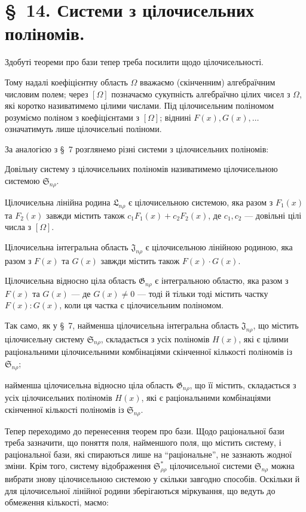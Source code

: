 \documentclass[11pt]{article}
\providecommand{\Ssys}{\mathfrak{S}}
\providecommand{\Jdom}{\mathfrak{J}}
\providecommand{\Gdom}{\mathfrak{G}}
\providecommand{\Lsys}{\mathfrak{L}}
\begin{document}
\section*{\S\ 14. Системи з цілочисельних поліномів.}

Здобуті теореми про бази тепер треба посилити щодо цілочисельності.

Тому надалі коефіцієнтну область $\Omega$ вважаємо (скінченним) алгебраїчним числовим полем; через $[\Omega]$ позначаємо сукупність алгебраїчно цілих чисел з $\Omega$, які коротко називатимемо цілими числами. Під цілочисельним поліномом розуміємо поліном з коефіцієнтами з $[\Omega]$; віднині $F(x),G(x),\ldots$ означатимуть лише цілочисельні поліноми.

За аналогією з \S\ 7 розглянемо різні системи з цілочисельних поліномів:

Довільну систему з цілочисельних поліномів називатимемо цілочисельною системою $\Ssys_{n\rho}$.

Цілочисельна лінійна родина $\Lsys_{n\rho}$ є цілочисельною системою, яка разом з $F_1(x)$ та $F_2(x)$ завжди містить також $c_1F_1(x)+c_2F_2(x)$, де $c_1,c_2$ --- довільні цілі числа з $[\Omega]$.

Цілочисельна інтегральна область $\Jdom_{n\rho}$ є цілочисельною лінійною родиною, яка разом з $F(x)$ та $G(x)$ завжди містить також $F(x)\cdot G(x)$.

Цілочисельна відносно ціла область $\Gdom_{n\rho}$ є інтегральною областю, яка разом з $F(x)$ та $G(x)$ --- де $G(x)\ne0$ --- тоді й тільки тоді містить частку $F(x):G(x)$, коли ця частка є цілочисельним поліномом.

Так само, як у \S\ 7, найменша цілочисельна інтегральна область $\Jdom_{n\rho}$, що містить цілочисельну систему $\Ssys_{n\rho}$, складається з усіх поліномів $H(x)$, які є цілими раціональними цілочисельними комбінаціями скінченної кількості поліномів із $\Ssys_{n\rho}$;

найменша цілочисельна відносно ціла область $\Gdom_{n\rho}$, що її містить, складається з усіх цілочисельних поліномів $H(x)$, які є раціональними комбінаціями скінченної кількості поліномів із $\Ssys_{n\rho}$.

Тепер переходимо до перенесення теорем про бази. Щодо раціональної бази треба зазначити, що поняття поля, найменшого поля, що містить систему, і раціональної бази, які спираються лише на ``раціональне'', не зазнають жодної зміни. Крім того, систему відображення $\Ssys^*_{\rho\rho}$ цілочисельної системи $\Ssys_{n\rho}$ можна вибрати знову цілочисельною системою у скільки завгодно способів. Оскільки й для цілочисельної лінійної родини зберігаються міркування, що ведуть до обмеження кількості, маємо:
\end{document}
